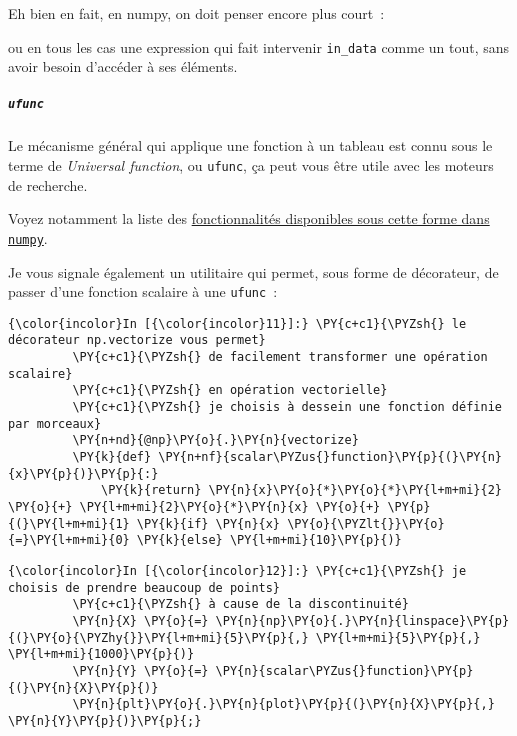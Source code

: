 Eh bien en fait, en numpy, on doit penser encore plus court~:

\begin{Shaded}
\begin{Highlighting}[frame=lines,framerule=0.6mm,rulecolor=\color{asisframecolor}]
\OperatorTok{=}
\end{Highlighting}
\end{Shaded}

ou en tous les cas une expression qui fait intervenir \texttt{in\_data}
comme un tout, sans avoir besoin d'accéder à ses éléments.

    \hypertarget{ufunc}{%
\subparagraph{\texorpdfstring{\texttt{ufunc}}{ufunc}}\label{ufunc}}

    Le mécanisme général qui applique une fonction à un tableau est connu
sous le terme de \emph{Universal function}, ou \texttt{ufunc}, ça peut
vous être utile avec les moteurs de recherche.

    Voyez notamment la liste des
\href{https://docs.scipy.org/doc/numpy-1.13.0/reference/ufuncs.html}{fonctionnalités
disponibles sous cette forme dans \texttt{numpy}}.

    Je vous signale également un utilitaire qui permet, sous forme de
décorateur, de passer d'une fonction scalaire à une \texttt{ufunc}~:

    \begin{Verbatim}[commandchars=\\\{\},frame=single,framerule=0.3mm,rulecolor=\color{cellframecolor}]
{\color{incolor}In [{\color{incolor}11}]:} \PY{c+c1}{\PYZsh{} le décorateur np.vectorize vous permet}
         \PY{c+c1}{\PYZsh{} de facilement transformer une opération scalaire}
         \PY{c+c1}{\PYZsh{} en opération vectorielle}
         \PY{c+c1}{\PYZsh{} je choisis à dessein une fonction définie par morceaux}
         \PY{n+nd}{@np}\PY{o}{.}\PY{n}{vectorize}
         \PY{k}{def} \PY{n+nf}{scalar\PYZus{}function}\PY{p}{(}\PY{n}{x}\PY{p}{)}\PY{p}{:}
             \PY{k}{return} \PY{n}{x}\PY{o}{*}\PY{o}{*}\PY{l+m+mi}{2} \PY{o}{+} \PY{l+m+mi}{2}\PY{o}{*}\PY{n}{x} \PY{o}{+} \PY{p}{(}\PY{l+m+mi}{1} \PY{k}{if} \PY{n}{x} \PY{o}{\PYZlt{}}\PY{o}{=}\PY{l+m+mi}{0} \PY{k}{else} \PY{l+m+mi}{10}\PY{p}{)}
\end{Verbatim}


    \begin{Verbatim}[commandchars=\\\{\},frame=single,framerule=0.3mm,rulecolor=\color{cellframecolor}]
{\color{incolor}In [{\color{incolor}12}]:} \PY{c+c1}{\PYZsh{} je choisis de prendre beaucoup de points}
         \PY{c+c1}{\PYZsh{} à cause de la discontinuité}
         \PY{n}{X} \PY{o}{=} \PY{n}{np}\PY{o}{.}\PY{n}{linspace}\PY{p}{(}\PY{o}{\PYZhy{}}\PY{l+m+mi}{5}\PY{p}{,} \PY{l+m+mi}{5}\PY{p}{,} \PY{l+m+mi}{1000}\PY{p}{)}
         \PY{n}{Y} \PY{o}{=} \PY{n}{scalar\PYZus{}function}\PY{p}{(}\PY{n}{X}\PY{p}{)}
         \PY{n}{plt}\PY{o}{.}\PY{n}{plot}\PY{p}{(}\PY{n}{X}\PY{p}{,} \PY{n}{Y}\PY{p}{)}\PY{p}{;}
\end{Verbatim}


